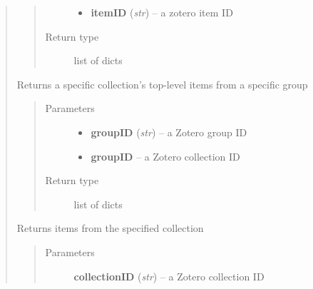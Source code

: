 \documentclass[letterpaper,10pt,english]{sphinxmanual}
\begin{document}
\begin{quote}
\begin{fulllineitems}
\begin{quote}
\begin{description}
\begin{itemize}
\item {} 
\textbf{itemID} (\emph{str}) -- a zotero item ID

\end{itemize}

\item[{Return type}] \leavevmode
list of dicts

\end{description}\end{quote}

\end{fulllineitems}



\begin{fulllineitems}
\label{index:pyzotero.zotero.Zotero.group_collection_top}
Returns a specific collection's top-level items from a specific group
\begin{quote}\begin{description}
\item[{Parameters}] \leavevmode\begin{itemize}
\item {} 
\textbf{groupID} (\emph{str}) -- a Zotero group ID

\item {} 
\textbf{groupID} -- a Zotero collection ID

\end{itemize}

\item[{Return type}] \leavevmode
list of dicts

\end{description}\end{quote}

\end{fulllineitems}



\begin{fulllineitems}
\label{index:pyzotero.zotero.Zotero.collection_items}
Returns items from the specified collection
\begin{quote}\begin{description}
\item[{Parameters}] \leavevmode
\textbf{collectionID} (\emph{str}) -- a Zotero collection ID


\end{description}
\end{quote}
\end{fulllineitems}
\end{quote}
\end{document}
